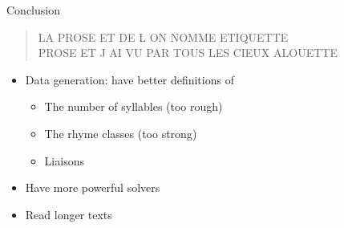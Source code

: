 \documentclass[unknownkeysallowed]{beamer}
\begin{document}
\begin{frame}[fragile]{Conclusion}
\begin{quote}
\small
\og LA PROSE ET DE L ON NOMME ETIQUETTE \\
 PROSE ET J AI VU PAR TOUS LES CIEUX ALOUETTE \fg
\end{quote}

\begin{itemize}
\item Data generation: have better definitions of
\begin{itemize}
\item The number of syllables (too rough)
\item The rhyme classes (too strong)
\item Liaisons
\end{itemize}
\item Have more powerful solvers
\item Read longer texts
\end{itemize}
\end{frame}
\end{document}
